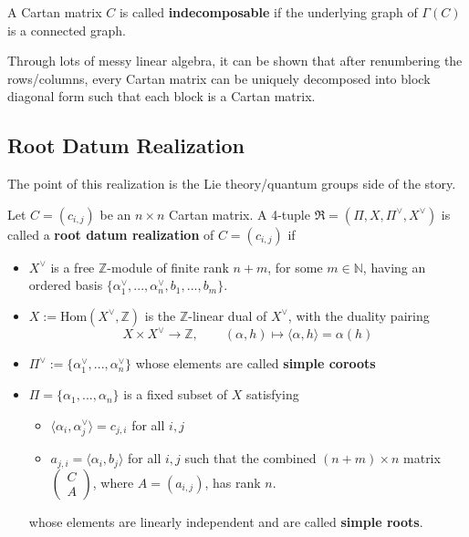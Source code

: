 \begin{definition}
    A Cartan matrix $C$ is called \textbf{indecomposable} if the underlying graph of $\Gamma(C)$ is a connected graph.
\end{definition}

Through lots of messy linear algebra, it can be shown that after renumbering the rows/columns, every Cartan matrix can be uniquely decomposed into block diagonal form such that each block is a Cartan matrix.

\subsection{Root Datum Realization}

The point of this realization is the Lie theory/quantum groups side of the story.

\begin{definition}
    Let $C=(c_{i,j})$ be an $n\times n$ Cartan matrix. A 4-tuple $\mathfrak{R}= (\Pi, X, \Pi^\vee, X^\vee)$ is called a \textbf{root datum realization} of $C=(c_{i,j})$ if 
    \begin{itemize}
        \item $X^\vee$ is a free $\mathbb{Z}$-module of finite rank $n+m$, for some $m\in \mathbb{N}$, having an ordered basis $\{\alpha_1^\vee, ..., \alpha_n^\vee, b_1,...,b_m\}$. 
        \item $X:= \text{Hom}(X^\vee,\mathbb{Z})$ is the $\mathbb{Z}$-linear dual of $X^\vee$, with the duality pairing 
        \[X\times X^\vee \to \mathbb{Z}, \qquad (\alpha, h) \mapsto \langle \alpha, h \rangle = \alpha(h)\]
        \item $\Pi^\vee := \{\alpha_1^\vee, ..., \alpha_n^\vee \}$ whose elements are called \textbf{simple coroots}
        \item $\Pi = \{\alpha_1,...,\alpha_n\}$ is a fixed subset of $X$ satisfying 
        \begin{itemize}
            \item $\langle \alpha_i, \alpha_j^\vee \rangle = c_{j,i}$ for all $i,j$
            \item $a_{j,i} = \langle \alpha_i, b_j\rangle$ for all $i,j$ such that the combined $(n+m)\times n$ matrix $\begin{pmatrix}
            C \\ A
            \end{pmatrix}$, where $A=(a_{i,j})$, has rank $n$.
        \end{itemize}
        whose elements are linearly independent and are called \textbf{simple roots}.
    \end{itemize}
\end{definition}

